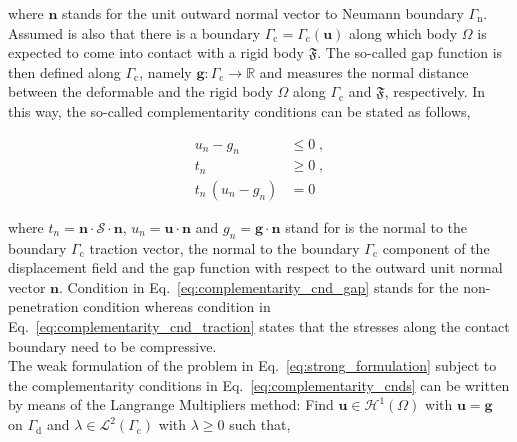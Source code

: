 \documentclass[10pt,a4paper]{article}
\begin{document}
where $\mathbf{n}$ stands for the unit outward normal vector to Neumann boundary $\Gamma_{\text{n}}$.\\

Assumed is also that there is a boundary $\Gamma_{\text{c}} = \Gamma_{\text{c}} (\mathbf{u})$ along which body $\Omega$ is expected to come into contact with a rigid body $\mathfrak{F}$. The so-called gap function is then defined along $\Gamma_{\text{c}}$, namely $\mathbf{g}:\Gamma_{\text{c}} \rightarrow \mathbb{R}$ and measures the normal distance between the deformable and the rigid body $\Omega$ along $\Gamma_{\text{c}}$ and $\mathfrak{F}$, respectively. In this way, the so-called complementarity conditions can be stated as follows,

\begin{subequations}
	\begin{alignat}{1}
		u_n - g_n &\le 0 \;, \label{eq:complementarity_cnd_gap} \\
		t_n &\ge 0 \;,  \label{eq:complementarity_cnd_traction} \\
		t_n\,(u_n - g_n) &= 0 \label{eq:complementarity_cnd_mixed}
	\end{alignat}
	\label{eq:complementarity_cnds}
\end{subequations}

where $t_n = \mathbf{n} \cdot \boldsymbol{\mathcal{S}} \cdot \mathbf{n}$, $u_n = \mathbf{u} \cdot \mathbf{n}$ and $g_n = \mathbf{g} \cdot \mathbf{n}$ stand for is the normal to the boundary $\Gamma_{\text{c}}$ traction vector, the normal to the boundary $\Gamma_{\text{c}}$ component of the displacement field and the gap function with respect to the outward unit normal vector $\mathbf{n}$. Condition in Eq.~\eqref{eq:complementarity_cnd_gap} stands for the non-penetration condition whereas condition in Eq.~\eqref{eq:complementarity_cnd_traction} states that the stresses along the contact boundary need to be compressive.\\

The weak formulation of the problem in Eq.~\eqref{eq:strong_formulation} subject to the complementarity conditions in Eq.~\eqref{eq:complementarity_cnds} can be written by means of the Langrange Multipliers method: Find $\mathbf{u} \in \boldsymbol{\mathcal{H}}^1 (\Omega)$ with $\mathbf{u} = \mathbf{g}$ on $\Gamma_{\text{d}}$ and $\lambda \in \mathcal{L}^2(\Gamma_{\text{c}})$ with $\lambda \ge 0$ such that,
\end{document}
